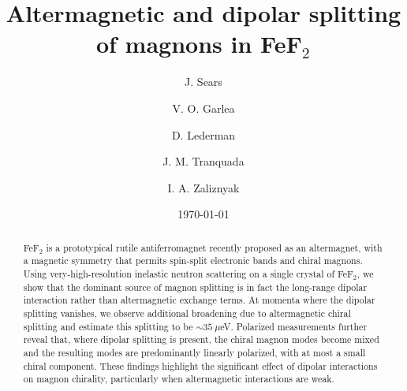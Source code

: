 \documentclass[aps, prl, twocolumn, superscriptaddress, longbibliography]{revtex4-2}
\begin{document}

\title{Altermagnetic and dipolar splitting of magnons in FeF$_2$}


\author{J. Sears}


\author{V. O. Garlea}

\author{D. Lederman}

\author{J. M. Tranquada}

\author{I. A. Zaliznyak}


\date{\today}

\begin{abstract}
FeF$_2$ is a prototypical rutile antiferromagnet recently proposed as an altermagnet, with a magnetic symmetry that permits spin-split electronic bands and chiral magnons. Using very-high-resolution inelastic neutron scattering on a single crystal of FeF$_2$, we show that the dominant source of magnon splitting is in fact the long-range dipolar interaction rather than altermagnetic exchange terms. At momenta where the dipolar splitting vanishes, we observe additional broadening due to altermagnetic chiral splitting and estimate this splitting to be $\sim 35~\mu$eV. Polarized measurements further reveal that, where dipolar splitting is present, the chiral magnon modes become mixed and the resulting modes are predominantly linearly polarized, with at most a small chiral component. These findings highlight the significant effect of dipolar interactions on magnon chirality, particularly when altermagnetic interactions are weak.

\end{abstract}


\maketitle
\end{document}
